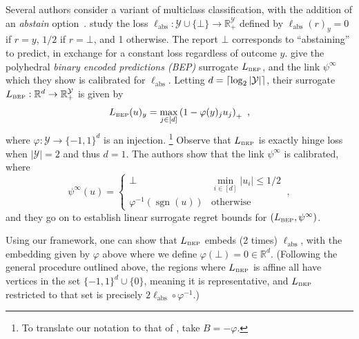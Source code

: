 \documentclass[11pt]{article}
\newcommand{\reals}{\mathbb{R}}
\newcommand{\BEP}{L_{\text{\tiny BEP}}}
\newcommand{\ellabstain}{\ell_{\text{abs}}}
\newcommand{\Y}{\mathcal{Y}}
\DeclarePairedDelimiter\ceil{\lceil}{\rceil}
\DeclareMathOperator*{\sgn}{sgn}
\begin{document}
Several authors consider a variant of multiclass classification, with the addition of an \emph{abstain} option~\citep{bartlett2008classification,ramaswamy2018consistent,madras2018predict,elyaniv2010foundations,cortes2016learning}.
\citet{ramaswamy2018consistent} study the loss $\ellabstain: \Y \cup \{\bot\} \to \reals^\Y_+$ defined by $\ellabstain(r)_y = 0$ if $r=y$, $1/2$ if $r = \bot$, and 1 otherwise.
The report $\bot$ corresponds to ``abstaining'' to predict, in exchange for a constant loss regardless of outcome $y$. 
\citeauthor{ramaswamy2018consistent} give the polyhedral \emph{binary encoded predictions (BEP)} surrogate $\BEP$, and the link $\psi^\infty$ which they show is calibrated for $\ellabstain$.
Letting $d = \ceil{\log_2 |\Y|}$, their surrogate $\BEP : \reals^d \to \reals^\Y_+$ is given by
\begin{equation}\label{eq:abstain-surrogate}
\BEP(u)_y = \max_{j \in [d]} \left(1 - \varphi(y)_j u_j\right)_+~,
\end{equation}
where $\varphi:\Y\to\{-1,1\}^d$ is an injection.%
\footnote{To translate our notation to that of \citet{ramaswamy2018consistent}, take $B = -\varphi$.}
Observe that $\BEP$ is exactly hinge loss when $|\Y|=2$ and thus $d=1$. 
The authors show that the link $\psi^{\infty}$ is calibrated, where
\begin{equation}\label{eq:abstain-link}
  \psi^{\infty}(u) = \begin{cases}
	\bot & \min_{i \in [d]} |u_i| \leq 1/2\\ %
	\varphi^{-1}(\sgn(u)) &\text{otherwise}
  \end{cases}~,
\end{equation}
and they go on to establish linear surrogate regret bounds for $(\BEP,\psi^{\infty})$.

Using our framework, one can show that $\BEP$ embeds (2 times) $\ellabstain$, with the embedding given by $\varphi$ above where we define $\varphi(\bot) = 0 \in \reals^d$.
(Following the general procedure outlined above, the regions where $\BEP$ is affine all have vertices in the set $\{-1,1\}^d \cup \{0\}$, meaning it is representative, and $\BEP$ restricted to that set is precisely $2\ellabstain \circ \varphi^{-1}$.)
\end{document}
